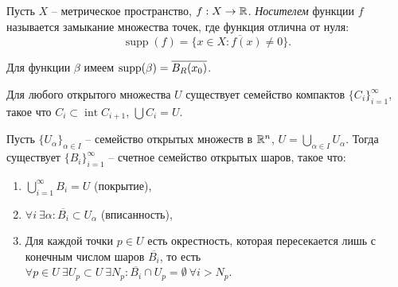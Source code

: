 \vspace{-15pt}

\begin{definition}
	Пусть $X$ -- метрическое пространство, $f : X \to \mathbb{R}$. 
	\textit{Носителем} функции $f$ называется замыкание множества точек, где функция отлична от нуля:
	\[ \operatorname{supp}(f) = \overline{\{x \in X : f(x) \neq 0\}}. \]
\end{definition}



\begin{example}
	Для функции $\beta$ имеем $\operatorname{supp}(\beta) = \overline{B_R(x_0)}$.
\end{example}

\begin{problem}
	Для любого открытого множества $U$ существует семейство компактов $\{C_i\}_{i=1}^{\infty}$, такое что $C_i \subset \operatorname{int} C_{i+1}$, $\bigcup C_i = U$.
\end{problem}

\begin{lemma}
	Пусть $\{U_{\alpha}\}_{\alpha \in I}$ -- семейство открытых множеств в $\mathbb{R}^n$, $U = \bigcup_{\alpha \in I} U_{\alpha}$. 
	Тогда существует $\{B_i\}_{i=1}^{\infty}$ -- счетное семейство открытых шаров, такое что:
	\begin{enumerate}[itemsep = 0pt, topsep = 5pt]
		\item $\bigcup_{i=1}^{\infty} B_i = U$ (покрытие), 
		\item $\forall i \ \exists \alpha : \overline{B_i} \subset U_{\alpha}$ (вписанность), 
		\item Для каждой точки $p \in U$ есть окрестность, которая пересекается лишь с конечным числом шаров $\overline{B_i}$, то есть $\forall p \in U \ \exists U_p \subset U \ \exists N_p : \overline{B_i} \cap U_p = \emptyset \ \forall i > N_p$.
	\end{enumerate}
\end{lemma}


